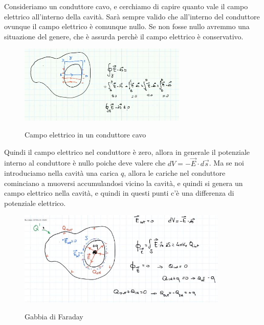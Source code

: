 \begin{esempio}
	Consideriamo un conduttore cavo, e cerchiamo di capire quanto vale il campo elettrico all'interno della cavità. Sarà sempre valido che all'interno del conduttore ovunque il campo elettrico è comunque nullo. Se non fosse nullo avremmo una situazione del genere, che è assurda perchè il campo elettrico è conservativo.
	\begin{figure}[h]
		\begin{center}
			\includegraphics[width=8cm]{lezione9/images/3 Campo elettrico nei materiali.jpg}\\
			\caption{Campo elettrico in un conduttore cavo}
		\end{center}
	\end{figure}

Quindi il campo elettrico nel conduttore è zero, allora in generale il potenziale interno al conduttore è nullo poiche deve valere che $dV=-\vec{E} \cdot d\vec{s}$. Ma se noi introduciamo nella cavità una carica $q$, allora le cariche nel conduttore cominciano a muoversi accumulandosi vicino la cavità, e quindi si genera un campo elettrico nella cavità, e quindi in questi punti c'è una differenza di potenziale elettrico.

	\begin{figure}[h]
	\begin{center}
		\includegraphics[width=10cm]{lezione9/images/4 Campo elettrico nei materiali.jpg}\\
		\caption{Gabbia di Faraday}
	\end{center}
\end{figure}

\end{esempio}


